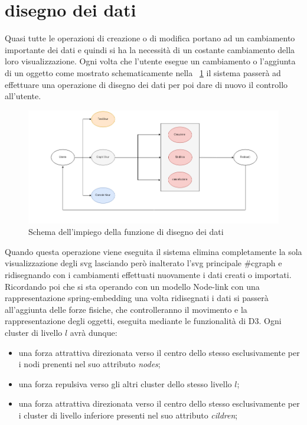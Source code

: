 {\section{disegno dei dati}
Quasi tutte le operazioni di creazione o di modifica portano ad un cambiamento importante dei dati e quindi si ha la necessità di un costante cambiamento della loro visualizzazione. Ogni volta che l'utente esegue un cambiamento o l'aggiunta di un oggetto come mostrato schematicamente nella \figurename~\ref{fig:redraw} il sistema passerà ad effettuare una operazione di disegno dei dati per poi dare di nuovo il controllo all'utente.
\begin{figure}[!htb]
	\begin{center}
		\includegraphics[width=1 \linewidth]{figure/redraw}
	\end{center}
	\caption{Schema dell'impiego della funzione di disegno dei dati \label{fig:redraw}}
\end{figure}
\newline
Quando questa operazione viene eseguita il sistema elimina completamente la sola visualizzazione degli svg lasciando però inalterato l'svg principale \#cgraph e ridisegnando con i cambiamenti effettuati nuovamente i dati creati o importati. Ricordando poi che si sta operando con un modello Node-link con una rappresentazione spring-embedding una volta ridisegnati i dati si passerà all'aggiunta delle forze fisiche, che controlleranno il movimento e la rappresentazione degli oggetti, eseguita mediante le funzionalità di D3. Ogni cluster di livello $l$ avrà dunque:
\begin{itemize}
	\item una forza attrattiva direzionata verso il centro dello stesso esclusivamente per i nodi prenenti nel suo attributo \textit{nodes};
	\item una forza repulsiva verso gli altri cluster dello stesso livello $l$; 
	\item una forza attrattiva direzionata verso il centro dello stesso esclusivamente per i cluster di livello inferiore presenti nel suo attributo \textit{cildren};

\end{itemize}}
